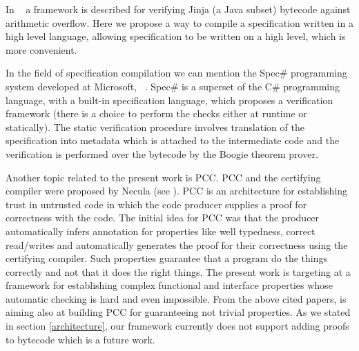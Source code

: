 In ~\cite{WildmoserN-ESOP05} a framework is described for verifying Jinja (a Java subset) bytecode against arithmetic overflow. 
Here we propose a way to compile a specification written in a high level language, allowing specification to be written on a 
high level, which is more convenient.

In the field of specification compilation we can mention the Spec\# programming system developed at Microsoft,
~\cite{BLS04sp}. Spec\# is a superset of the C\# programming language, with a built-in  specification language,
which proposes a verification framework (there is a choice to perform the checks either at runtime or statically). 
 The static verification procedure  involves translation of the specification into metadata which is attached to the intermediate code 
 and the verification is performed over the bytecode by the Boogie theorem prover.

Another topic related to the present work is PCC.
 PCC and the certifying compiler were proposed by Necula (see \cite{Necula97,ComNec,DesNecLee98}). PCC is an architecture for establishing trust in untrusted code 
in which the code producer supplies a proof for correctness with the code. 
The initial idea for PCC  was that the producer automatically infers annotation for properties like well typedness, 
correct read/writes and automatically generates the proof for their correctness using the certifying compiler. 
Such properties guarantee that a program do the things correctly and not that it does the right things. The present work is targeting at a
 framework for establishing complex functional and interface properties whose automatic checking is hard and even impossible. 
 From the above cited papers, \cite{BM05plb} is aiming also at building PCC for
 guaranteeing not trivial properties. As we stated in section \ref{architecture}, our framework currently does not support adding proofs to bytecode 
 which is a future work. 
 
